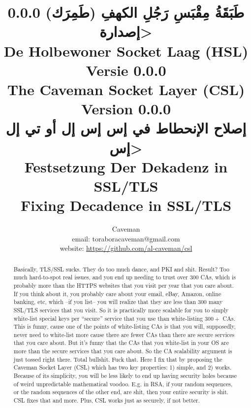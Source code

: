 \documentclass{article}
\author{Caveman\\
email: toraboracaveman@gmail.com\\
website: \url{https://github.com/al-caveman/csl}}
\title{
0.0.0 \<طَبَقَةُ مِقْبَسِ رَجُلِ الكهفِ (طَمِرَك) إصدارة>\\
De Holbewoner Socket Laag (HSL) Versie 0.0.0\\
The Caveman Socket Layer (CSL) Version 0.0.0\\
{\large \<إصلاح الإنحطاط في إس إس إل أو تي إل إس>}\\
{\large Festsetzung Der Dekadenz in SSL/TLS}\\
{\large Fixing Decadence in SSL/TLS}}
\begin{document}
 \maketitle
\begin{abstract}
    Basically, TLS/SSL sucks. They do too much dance, and PKI and shit. Result?
    Too much hard-to-spot real issues, and you end up needing to trust over
    $300$ CAs, which is probably more than the HTTPS websites that you visit
    per year that you care about. If you think about it, you probably care
    about your email, eBay, Amazon, online banking, etc, which --if you list--
    you will realize that they are less than $300$ many SSL/TLS services that
    you visit. So it is practically more scalable for you to simply white-list
    special keys per ``secure'' service that you use than white-listing $300+$
    CAs. This is funny, cause one of the points of white-listing CAs is that
    you will, supposedly, never need to white-list more cause there are fewer
    CAs than there are secure services that you care about. But it's funny that
    the CAs that you white-list in your OS are more than the secure services
    that you care about. So the CA scalability argument is just tossed right
    there. Total bullshit. Fuck that. Here I fix that by proposing the Caveman
    Socket Layer (CSL) which has two key properties: 1) simple, and 2) works.
    Because of its simplicity, you will be less likely to end up having
    security holes because of weird unpredictable mathematical voodoo. E.g. in
    RSA, if your random sequences, or the random sequences of the other end,
    are shit, then your entire security is shit.  CSL fixes that and more.
    Plus, CSL works just as securely, if not better.
\end{abstract}
\end{document}
